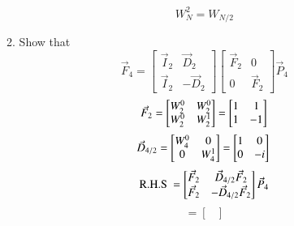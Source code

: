 \documentclass[journal,12pt,twocolumn]{IEEEtran}
\renewcommand\thesection{\arabic{section}}
\begin{document}
\begin{enumerate}[label=\thesection.\arabic*]
\begin{enumerate}[label=\arabic*.,ref=\thesection.\theenumi]
\begin{equation}
	\end{equation}
	\begin{equation}
		\boxed{W_{N}^{2} = W_{N/2}}
	\end{equation}
	\item Show that 
	\begin{equation}
		\vec{F}_{4}=
		\begin{bmatrix}
			\vec{I}_{2} & \vec{D}_{2} \\
			\vec{I}_{2} & -\vec{D}_{2}
		\end{bmatrix}
		\begin{bmatrix}
			\vec{F}_{2} & 0 \\
			0 & \vec{F}_{2}
		\end{bmatrix}
		\vec{P}_{4}
	\end{equation}
	\solution
	\begin{equation}
		\vec{F}_{2} = 
		\begin{bmatrix}
			W_{2}^0	&	W_{2}^0\\
			W_{2}^0	&	W_{2}^1
		\end{bmatrix}
		=		\begin{bmatrix}
			1	&	1\\
			1	&	-1
		\end{bmatrix}\\
	\end{equation}
	\begin{equation}
		\vec{D}_{4/2} =
		\begin{bmatrix}
			W_4^0 &	0\\
			0	&	W_4^1 
		\end{bmatrix}
		=\begin{bmatrix}
			1	&	0\\
			0	&	-i 
		\end{bmatrix}\\
	\end{equation}
	\begin{equation}
		\text{R.H.S } = 
		\begin{bmatrix}
			\vec{F}_{2} & \vec{D}_{4/2} \vec{F}_{2}\\
			\vec{F}_{2} & -\vec{D}_{4/2} \vec{F}_{2}\\
		\end{bmatrix}\vec{P}_{4}\\
	\end{equation}
	\begin{equation}
		=\begin{bmatrix}

\end{bmatrix}
\end{equation}
\end{enumerate}
\end{enumerate}
\end{document}
